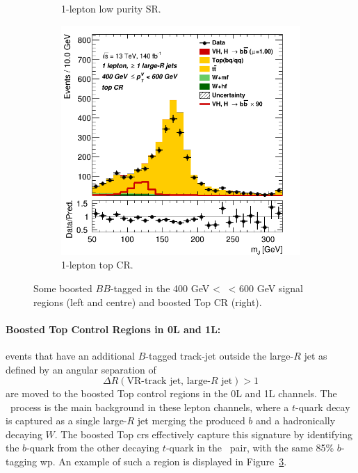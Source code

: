 \begin{figure}[h!]
\begin{subfigure}[b]{0.32\textwidth}
      \caption{1-lepton low purity SR.}
      \label{fig:plots_VHboost_ex_1L_SR}
  \end{subfigure}
  \begin{subfigure}[b]{0.32\textwidth}
    \centering
    \includegraphics[width=\textwidth]{Images/VH/Own_fit/prefit_VHbb/Region_distmBB_BMax600_BMin400_incFat1_Fat1_DSRtopaddbjetcr_J0_TTypebb_incJet1_T2_L1_Y6051_Prefit.png}
    \caption{1-lepton top CR.}
    \label{fig:plots_VHboost_ex_1L_top}
\end{subfigure}
  \caption{Some boosted $BB$-tagged in the 400 GeV < \ptv\ < 600 GeV signal regions (left and centre) and boosted Top CR (right).}
  \label{fig:plots_VHboost_ex}
\end{figure} 

\paragraph{Boosted Top Control Regions in 0L and 1L:} events that have an additional $B$-tagged track-jet outside the large-$R$ jet as defined by an angular separation of \[\Delta R(\textrm{VR-track jet, large-}R\textrm{ jet}) > 1\] are moved to the boosted Top control regions in the 0L and 1L channels. The \ttb\ process is the main background in these lepton channels, where a $t$-quark decay is captured as a single large-$R$ jet merging the produced $b$ and a hadronically decaying $W$. The boosted Top \glspl{cr} effectively capture this signature by identifying the $b$-quark from the other decaying $t$-quark in the \ttb\ pair, with the same 85\% $b$-tagging \gls{wp}. An example of such a region is displayed in Figure~\ref{fig:plots_VHboost_ex}.\\

